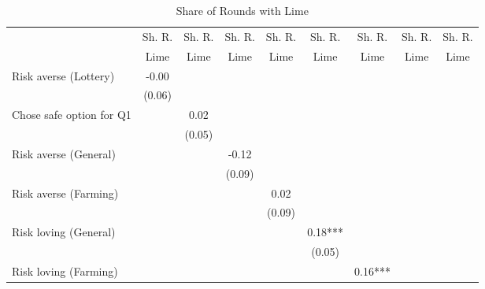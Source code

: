 \begin{table}[htbp]
\centering
\hspace*{-1.2cm}
\begin{threeparttable}
\small
\caption{Share of Rounds with Lime}
\label{tab:B5lime}
\begin{tabular}{l cccccccc}
\hline
\hline
& Sh. R. & Sh. R. & Sh. R. & Sh. R. & Sh. R. & Sh. R. & Sh. R. & Sh. R. \\
& Lime& Lime& Lime& Lime& Lime& Lime& Lime& Lime \\ \hline
Risk averse (Lottery)&       -0.00   &               &               &               &               &               &               &               \\
                    &      (0.06)   &               &               &               &               &               &               &               \\
Chose safe option for Q1&               &        0.02   &               &               &               &               &               &               \\
                    &               &      (0.05)   &               &               &               &               &               &               \\
Risk averse (General)&               &               &       -0.12   &               &               &               &               &               \\
                    &               &               &      (0.09)   &               &               &               &               &               \\
Risk averse (Farming)&               &               &               &        0.02   &               &               &               &               \\
                    &               &               &               &      (0.09)   &               &               &               &               \\
Risk loving (General)&               &               &               &               &        0.18***&               &               &               \\
                    &               &               &               &               &      (0.05)   &               &               &               \\
Risk loving (Farming)&               &               &               &               &               &        0.16***&               &               \\

\end{tabular}
\end{threeparttable}
\end{table}
